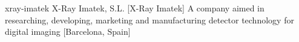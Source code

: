 \newglsXcompany%
{xray-imatek}%
{X-Ray Imatek, S.L.}%
[X-Ray Imatek]%
{A company aimed in researching, developing, marketing and manufacturing detector technology for digital  imaging}%
[Barcelona, Spain]%